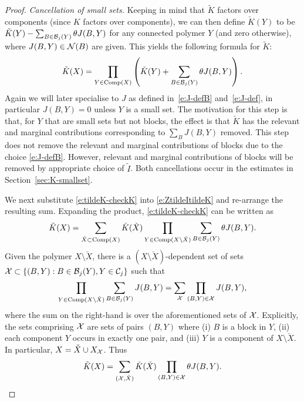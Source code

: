 \documentclass[11pt]{amsart}
\numberwithin{equation}{section}
\numberwithin{theorem}{section}
\newcommand{\1}{{\bf 1}}
\newcommand{\Comp}{\operatorname{Comp}}
\begin{document}
\begin{proof}
\smallskip
\noindent
\emph{Cancellation of small sets.}
%
Keeping in mind that $\tilde K$ factors over components (since $K$ factors over components), we can then define
$\check{K}(Y)$ to be $\tilde K(Y) - \sum_{B\in\mathcal B_{j}(Y)}\theta J(B,Y)$
for any connected polymer $Y$ (and zero otherwise), where $J(B,Y)\in\mathcal N(B)$ are given.
%
This yields the following formula for $\tilde K$:
\begin{equation} \label{e:tildeK-checkK}
  \tilde K(X) = \prod_{Y \in \Comp(X)} \pa{\check{K}(Y) + \sum_{B \in \cB_j(Y)} \theta J(B,Y)}.
\end{equation}
Again we will later specialise to $J$ as defined in~\eqref{e:J-defB} and~\eqref{e:J-def},
  in particular $J(B,Y) = 0$ unless $Y$ is a small set.
The motivation for this step is that, for $Y$ that are small sets but not blocks, the effect is that $\check{K}$
has the relevant and marginal contributions corresponding to $\sum_B J(B,Y)$ removed.
This step does not remove  the relevant and marginal contributions of blocks due to the choice \eqref{e:J-defB}.
However, relevant and marginal contributions of blocks will be removed by appropriate choice of $\tilde I$.
Both cancellations occur in the estimates in Section~\ref{sec:K-smallset}.


We next substitute \eqref{e:tildeK-checkK} into
\eqref{e:ZtildeItildeK} and re-arrange the resulting sum.  Expanding
the product, \eqref{e:tildeK-checkK} can be written as
\begin{equation}
  \tilde K(X) = \sum_{\check{X} \subset \Comp(X)}  \check{K}(\check{X}) \prod_{Y \in \Comp(X \setminus \check{X})} \sum_{B \in \cB_j(Y)} \theta J(B,Y)
  .
\end{equation}
Given the polymer $X \setminus \check{X}$, 
there is a $(X\setminus \check{X})$-dependent set of sets
$\mathcal X 
\subset \{(B,Y): B\in \mathcal B_{j}(Y), Y\in \mathcal C_{j}\}$
such that
\begin{equation}
  \prod_{Y \in \Comp(X \setminus \check{X})} \sum_{B \in \cB_j(Y)}
  J(B,Y) = \sum_{\cX} \prod_{(B,Y)\in \cX} J(B,Y),
\end{equation}
where the sum on the right-hand is over the aforementioned sets of
$\mathcal X$. Explicitly, the sets comprising $\mathcal X$ are sets 
of pairs $(B,Y)$ where (i) $B$ is a block in $Y$, (ii) each component
$Y$ occurs in exactly one pair, and (iii) $Y$ is a component of
$X\setminus \check{X}$. In particular, $X = \check{X}\cup X_{\mathcal X}$.
Thus
\begin{equation}
  \label{eq:tildeK}
  \tilde K(X) = \sum_{ (\mathcal X,\check{X}) 
  } \check{K}(\check{X}) \prod_{(B,Y) \in \mathcal X} \theta J(B,Y)
  .
\end{equation}
%


\end{proof}
\end{document}
